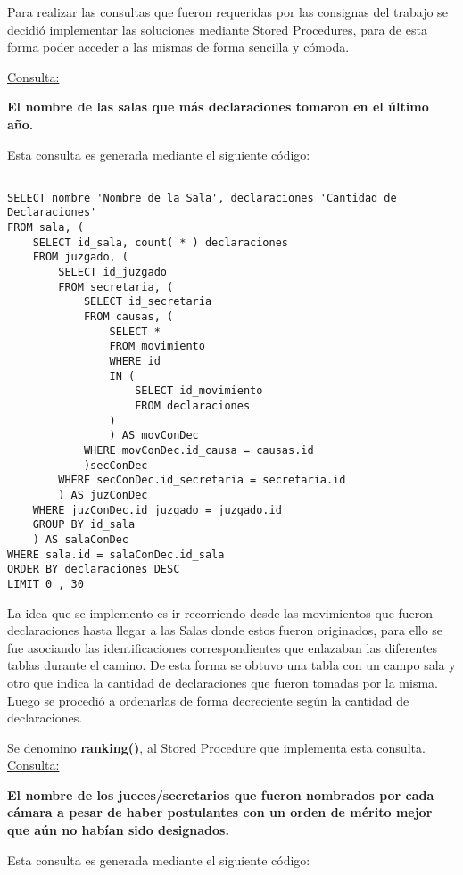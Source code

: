 Para realizar las consultas que fueron requeridas por las consignas del trabajo se decidió implementar las soluciones mediante Stored Procedures, para de esta forma poder acceder a las mismas de forma sencilla y cómoda.

\underline{Consulta:}

\textbf{El nombre de las salas que más declaraciones tomaron en el último año.}

Esta consulta es generada mediante el siguiente código:

\begin{verbatim}

SELECT nombre 'Nombre de la Sala', declaraciones 'Cantidad de Declaraciones'
FROM sala, (
	SELECT id_sala, count( * ) declaraciones
	FROM juzgado, (
		SELECT id_juzgado
		FROM secretaria, (
			SELECT id_secretaria
			FROM causas, (
				SELECT *
				FROM movimiento
				WHERE id
				IN (
					SELECT id_movimiento
					FROM declaraciones
				)
				) AS movConDec
			WHERE movConDec.id_causa = causas.id
			)secConDec
		WHERE secConDec.id_secretaria = secretaria.id
		) AS juzConDec
	WHERE juzConDec.id_juzgado = juzgado.id
	GROUP BY id_sala
	) AS salaConDec
WHERE sala.id = salaConDec.id_sala
ORDER BY declaraciones DESC
LIMIT 0 , 30

\end{verbatim}

La idea que se implemento es ir recorriendo desde las movimientos que fueron declaraciones hasta llegar a las Salas donde estos fueron originados, para ello se fue asociando las identificaciones correspondientes que enlazaban las diferentes tablas durante el camino. De esta forma se obtuvo una tabla con un campo sala y otro que indica la cantidad de declaraciones que fueron tomadas por la misma. Luego se procedió a ordenarlas de forma decreciente según la cantidad de declaraciones.

Se denomino \textbf{ranking()}, al Stored Procedure que implementa esta consulta.
\bigskip
\underline{Consulta:}

\textbf{El nombre de los jueces/secretarios que fueron nombrados por cada cámara a pesar de haber postulantes con un orden de mérito mejor que aún no habían sido designados.}

Esta consulta es generada mediante el siguiente código:

